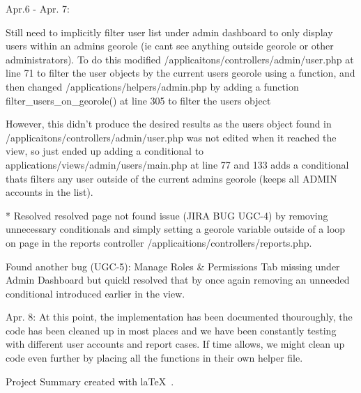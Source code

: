 \documentclass{article}
\begin{document}
Apr.6 - Apr. 7:

    Still need to implicitly filter user list under admin dashboard to only display users within an admins georole
    (ie cant see anything outside georole or other administrators).  To do this modified /applicaitons/controllers/admin/user.php 
    at line 71 to filter the user objects by the current users georole using a function, and then changed 
    /applications/helpers/admin.php by adding a function filter_users_on_georole() at line 305 to filter the users object
    
    However, this didn't produce the desired results as the users object found in /applicaitons/controllers/admin/user.php was not
    edited when it reached the view, so just ended up adding a conditional to applications/views/admin/users/main.php at line 77 and 
    133 adds a conditional thats filters any user outside of the current admins georole (keeps all ADMIN accounts in the list).
                
                
    * Resolved resolved page not found issue (JIRA BUG UGC-4) by removing unnecessary conditionals and simply setting a georole
    variable outside of a loop on page in the reports controller /applicaitions/controllers/reports.php.
      
    Found another bug (UGC-5): Manage Roles & Permissions Tab missing under Admin Dashboard but quickl resolved that by once again
    removing an unneeded conditional introduced earlier in the view.
            
Apr. 8:
    At this point, the implementation has been documented thouroughly, the code has been cleaned up in most places and
    we have been constantly testing with different user accounts and report cases.  If time allows, we might clean up code even
    further by placing all the functions in their own helper file.        
 
\vfill
\begin{center}
Project Summary created with la\TeX~.
\end{center}
\end{document}

